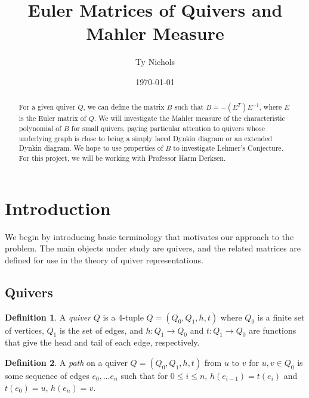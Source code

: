 \documentclass{amsart}
\theoremstyle{theorem}
\theoremstyle{theorem*}
\theoremstyle{definition}
\newtheorem{definition}{Definition}
\begin{document}
\date{\today}
\title[Euler Matrices and Mahler Measure] {Euler Matrices of Quivers and Mahler Measure}
\author[T. Nichols]{Ty Nichols}
\address{Department of Mathematics, Northeastern University, Boston,
    Massachusetts~02115}
\begin{abstract} For a given quiver $Q$, we can define the matrix $B$ such that
    $B = -(E^T)E^{-1}$, where $E$ is the Euler matrix of $Q$. We will
    investigate the Mahler measure of the characteristic polynomial of $B$ for
    small quivers, paying particular attention to quivers whose underlying graph
    is close to being a simply laced Dynkin diagram or an extended Dynkin
    diagram. We hope to use properties of $B$ to investigate Lehmer's
    Conjecture. For this project, we will be working with Professor Harm
    Derksen.
\end{abstract}
\maketitle

\section{Introduction}

We begin by introducing basic terminology that motivates our approach to the
problem. The main objects under study are quivers, and the related matrices are
defined for use in the theory of quiver representations.

\subsection{Quivers}

\begin{definition} \cite{dw} A \textit{quiver} $Q$ is a 4-tuple $Q = (Q_0, Q_1,
        h, t)$ where $Q_0$ is a finite set of vertices, $Q_1$ is the set of
    edges, and $h: Q_1 \rightarrow Q_0$ and $t : Q_1 \rightarrow Q_0$ are
    functions that give the head and tail of each edge, respectively.
\end{definition}

\begin{definition} \cite{dw} A \textit{path} on a quiver $Q = (Q_0, Q_1, h, t)$
    from $u$ to $v$ for $u, v \in Q_0$ is some sequence of edges $e_0, \dots
        e_n$ such that for $0 \leq i \leq n$, $h(e_{i-1}) = t(e_i)$ and $t(e_0) =
        u$, $h(e_n) = v$.
\end{definition}
\end{document}
